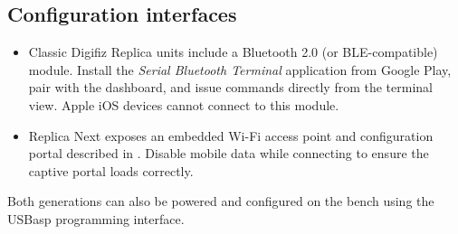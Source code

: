 \subsection{Configuration interfaces}
\begin{itemize}
    \item Classic Digifiz Replica units include a Bluetooth 2.0 (or BLE-compatible) module. Install the \emph{Serial Bluetooth Terminal} application from Google Play, pair with the dashboard, and issue commands directly from the terminal view. Apple iOS devices cannot connect to this module.
    \item Replica Next exposes an embedded Wi-Fi access point and configuration portal described in . Disable mobile data while connecting to ensure the captive portal loads correctly.
\end{itemize}
Both generations can also be powered and configured on the bench using the USBasp programming interface.
